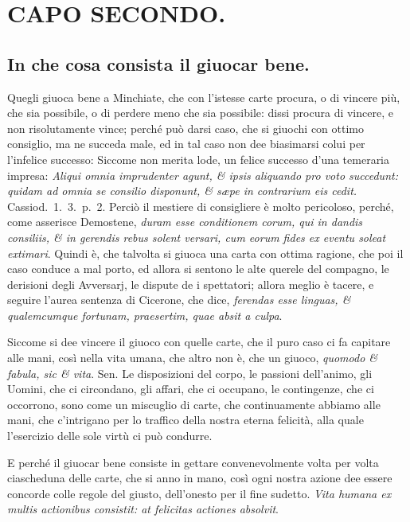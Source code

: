 \documentclass[11pt,a6paper]{article}
\begin{document}
\section{CAPO SECONDO.}

\subsection{In che cosa consista il giuocar bene.}

Quegli giuoca bene a Minchiate, che
con l'istesse carte procura, o di vincere
più, che sia possibile, o di perdere
meno che sia possibile: dissi procura di
vincere, e non risolutamente vince; perché
può darsi caso, che si giuochi con ottimo
consiglio, ma ne succeda male, ed in tal caso
non dee biasimarsi colui per l'infelice successo:
Siccome non merita lode, un felice successo
d'una temeraria impresa: \textit{Aliqui omnia imprudenter
agunt, \& ipsis aliquando pro voto
succedunt: quidam ad omnia se consilio disponunt,
\& sæpe in contrarium eis cedit.} Cassiod.\ 1.\ 3.\ p.\ 2.
Perciò il mestiere di consigliere
è molto pericoloso, perché, come asserisce
Demostene, \textit{duram esse conditionem corum,
qui in dandis consiliis, \& in gerendis
rebus solent versari, cum eorum fides ex eventu
soleat extimari}. Quindi è, che talvolta si
giuoca una carta con ottima ragione, che poi
il caso conduce a mal porto, ed allora si sentono
le alte querele del compagno, le derisioni
degli Avversarj, le dispute de i spettatori;
allora meglio è tacere, e seguire l'aurea
sentenza di Cicerone, che dice, \textit{ferendas
esse linguas, \& qualemcumque fortunam,
praesertim, quae absit a culpa}.

Siccome si dee vincere il giuoco con
quelle carte, che il puro caso ci fa capitare
alle mani, così nella vita umana, che altro
non è, che un giuoco, \textit{quomodo \& fabula,
sic \& vita}. Sen. Le disposizioni del corpo, le
passioni dell'animo, gli Uomini, che ci circondano,
gli affari, che ci occupano, le contingenze,
che ci occorrono, sono come un
miscuglio di carte, che continuamente abbiamo
alle mani, che c'intrigano per lo traffico
della nostra eterna felicità, alla quale l'esercizio
delle sole virtù ci può condurre.

E perché il giuocar bene consiste in gettare
convenevolmente volta per volta ciascheduna
delle carte, che si anno in mano,
così ogni nostra azione dee essere concorde
colle regole del giusto, dell'onesto per il
fine sudetto. \textit{Vita humana ex multis actionibus
consistit: at felicitas actiones absolvit}.
\end{document}
